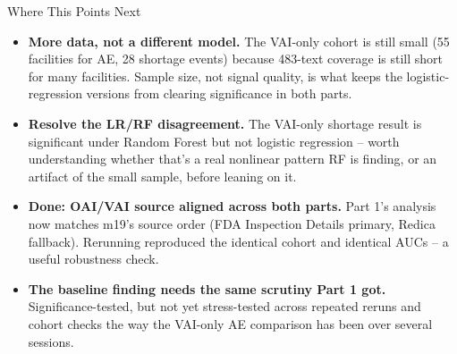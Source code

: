 \documentclass[aspectratio=169,10pt]{beamer}
\begin{document}
\begin{frame}{Where This Points Next}
\begin{itemize}
  \setlength{\itemsep}{9pt}
  \item \textbf{More data, not a different model.} The VAI-only cohort is still small (55
        facilities for AE, 28 shortage events) because 483-text coverage is still short for
        many facilities. Sample size, not signal quality, is what keeps the
        logistic-regression versions from clearing significance in both parts.
  \item \textbf{Resolve the LR/RF disagreement.} The VAI-only shortage result is significant
        under Random Forest but not logistic regression -- worth understanding whether that's
        a real nonlinear pattern RF is finding, or an artifact of the small sample, before
        leaning on it.
  \item \textbf{Done: OAI/VAI source aligned across both parts.} Part 1's analysis now matches
        m19's source order (FDA Inspection Details primary, Redica fallback). Rerunning
        reproduced the identical cohort and identical AUCs -- a useful robustness check.
  \item \textbf{The baseline finding needs the same scrutiny Part 1 got.} Significance-tested,
        but not yet stress-tested across repeated reruns and cohort checks the way the
        VAI-only AE comparison has been over several sessions.
\end{itemize}
\end{frame}
\end{document}
